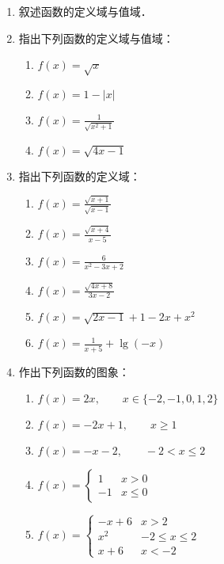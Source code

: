 \begin{enumerate}
    \item 叙述函数的定义域与值域．
    \item 指出下列函数的定义域与值域：
\begin{multicols}{2}
\begin{enumerate}
    \item $f(x)=\sqrt{x}$
    \item $f(x)=1-|x|$
    \item $f(x)=\frac{1}{\sqrt{x^2+1}}$
    \item $f(x)=\sqrt{4x-1}$
\end{enumerate}
\end{multicols}
    
    \item 指出下列函数的定义域：
\begin{multicols}{2}
\begin{enumerate}
\item $f(x)=\frac{\sqrt{x+1}}{\sqrt{x-1}}$
\item $f(x)=\frac{\sqrt{x+4}}{x-5}$
\item $f(x)=\frac{6}{x^2-3x+2}$
\item $f(x)=\frac{\sqrt{4x+8}}{3x-2}$
\item $f(x)=\sqrt{2x-1}+1-2x+x^2$
\item $f(x)=\frac{1}{x+5}+\lg(-x)$
\end{enumerate}
\end{multicols}
    \item 作出下列函数的图象：
\begin{enumerate}
    \item $f(x)=2x,\qquad x\in\{-2,-1,0,1,2\}$
    \item $f(x)=-2x+1,\qquad x\ge 1$
    \item $f(x)=-x-2,\qquad -2<x\le 2$
    \item $f(x)=\begin{cases}
        1&x>0\\-1&x\le 0
    \end{cases}$
    \item $f(x)=\begin{cases}
        -x+6  &  x>2\\
        x^2& -2\le x\le 2\\
        x+6& x<-2
    \end{cases}$
\end{enumerate}


\end{enumerate}
